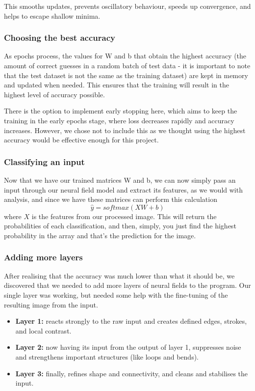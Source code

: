 \documentclass[10pt]{article}
\begin{document}
\begin{flushleft}
    This smooths updates, prevents oscillatory behaviour, speeds up convergence, and
    helps to escape shallow minima.

    \subsubsection{Choosing the best accuracy}

    As epochs process, the values for W and b that obtain the highest accuracy (the amount of correct guesses in a random
    batch of test data - it is important to note that the test dataset is not the same as the training dataset) are kept
    in memory and updated when needed.
    This ensures that the training will result in the highest level of accuracy possible.
    
    There is the option to implement early stopping here, which aims to keep the training in the
    early epochs stage, where loss decreases rapidly and accuracy increases.
    However, we chose not to include this as we thought using the highest accuracy would be
    effective enough for this project.

    \subsubsection{Classifying an input}

    Now that we have our trained matrices W and b, we can now simply pass an input through our neural field model and
    extract its features, as we would with analysis, and since we have these matrices can perform this calculation
    \[
        \hat{y} = softmax(XW + b)
    \]
    where $X$ is the features from our processed image.
    This will return the probabilities of each classification, and then, simply, you just find the highest
    probability in the array and that's the prediction for the image.

    \subsubsection{Adding more layers}

    After realising that the accuracy was much lower than what it should be, we discovered that we needed to add more
    layers of neural fields to the program.
    Our single layer was working, but needed some help with the fine-tuning of the resulting image from the input.

    \begin{itemize}
        \item \textbf{Layer 1:} reacts strongly to the raw input and creates defined edges, strokes, and local contrast.
        \item \textbf{Layer 2:} now having its input from the output of layer 1, suppresses noise and strengthens important
        structures (like loops and bends).
        \item \textbf{Layer 3:} finally, refines shape and connectivity, and cleans and stabilises the input.
    \end{itemize}


\end{flushleft}
\end{document}
